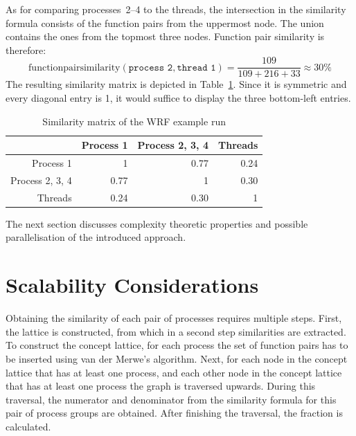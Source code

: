 \documentclass[a4paper, final, diplominf]{zih-template}
\begin{document}
As for comparing processes~2--4 to the threads, the intersection in the similarity formula consists of the function pairs from the uppermost node. The union contains the ones from the topmost three nodes.
Function pair similarity is therefore:
\begin{equation*}
	\text{functionpairsimilarity}(\texttt{process 2}, \texttt{thread 1}) = \frac{109}{109 + 216 + 33} \approx 30\%
\end{equation*}
The resulting similarity matrix is depicted in Table~\ref{tab:wrf-hybrid-similarity-matrix}.
Since it is symmetric and every diagonal entry is 1, it would suffice to display the three bottom-left entries.
\begin{table}[tb]
	\centering
	\caption{Similarity matrix of the WRF example run}
	\vspace{0.2cm}
	\begin{tabular}{r | r r r}
		                & Process 1 & Process 2, 3, 4 & Threads \\
		\hline
		Process 1       &    1      & 0.77            & 0.24    \\
		Process 2, 3, 4 & 0.77      &    1            & 0.30    \\
		Threads         & 0.24      & 0.30            &    1    \\
	\end{tabular}
	\label{tab:wrf-hybrid-similarity-matrix}
\end{table}

The next section discusses complexity theoretic properties and possible parallelisation of the introduced approach.

\section{Scalability Considerations}
\label{sec:new-scalability}
Obtaining the similarity of each pair of processes requires multiple steps.
First, the lattice is constructed, from which in a second step similarities are extracted.
To construct the concept lattice, for each process the set of function pairs has to be inserted using van der Merwe's algorithm.
Next, for each node in the concept lattice that has at least one process, and each other node in the concept lattice that has at least one process the graph is traversed upwards.
During this traversal, the numerator and denominator from the similarity formula for this pair of process groups are obtained.
After finishing the traversal, the fraction is calculated.
\end{document}
